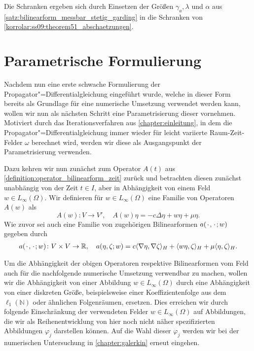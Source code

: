\documentclass[../main.tex]{subfiles}
\begin{document}
\begin{Korollar}
    \begin{Beweis}
        Die Schranken ergeben sich durch Einsetzen der Größen $\gamma_{a}, \lambda$ und $\alpha$ aus \cref{satz:bilinearform_messbar_stetig_garding} in die Schranken von \cref{korrolar:ss09:theorem51_abschaetzungen}.
    \end{Beweis}
\end{Korollar}


\section{Parametrische Formulierung} %
\label{section:parametrische_formulierung}

Nachdem nun eine erste schwache Formulierung der Propagator"=Differentialgleichung eingeführt wurde, welche in dieser Form bereits als Grundlage für eine numerische Umsetzung verwendet werden kann, wollen wir nun als nächsten Schritt eine Parametrisierung dieser vornehmen.
Motiviert durch das Iterationsverfahren aus \cref{chapter:einleitung}, in dem die Propagator"=Differentialgleichung immer wieder für leicht variierte Raum-Zeit-Felder $\omega$ berechnet wird, werden wir diese als Ausgangspunkt der Parametrisierung verwenden.

Dazu kehren wir nun zunächst zum Operator $A(t)$ aus \cref{definition:operator_bilinearform_zeit} zurück und betrachten diesen zunächst unabhängig von der Zeit $t \in I$, aber in Abhängigkeit von einem Feld $w \in L_{\infty}(\Omega)$.
Wir definieren für $w \in L_{\infty}(\Omega)$ eine Familie von Operatoren $A(w)$ als
\begin{equation}
    \label{eq:operator_feld}
    A(w) \colon V \to V', \quad A(w) \eta = - c \Delta \eta + w \eta + \mu \eta.
\end{equation}
Wie zuvor sei auch eine Familie von zugehörigen Bilinearformen $a({\mkern2mu\cdot\mkern2mu}, {\mkern2mu\cdot\mkern2mu}; w)$ gegeben durch
\begin{equation}
    \label{eq:bilinearform_feld}
    \begin{aligned}
        a({\mkern2mu\cdot\mkern2mu}, {\mkern2mu\cdot\mkern2mu}; w) \colon V \times V \to \mathbb{R}, \quad
        a(\eta, \zeta; w) = c\langle\nabla \eta,\nabla \zeta\rangle_{H} + \langle w \eta,\zeta\rangle_{H} + \mu \langle\eta,\zeta\rangle_{H}.
    \end{aligned}
\end{equation}

Um die Abhängigkeit der obigen Operatoren respektive Bilinearformen vom Feld auch für die nachfolgende numerische Umsetzung verwendbar zu machen, wollen wir die Abhängigkeit von einer Abbildung $w \in L_{\infty}(\Omega)$ durch eine Abhängigkeit von einer diskreten Größe, beispielsweise einer Koeffizientenfolge aus dem $\ell_{1}(\mathbb{N})$ oder ähnlichen Folgenräumen, ersetzen.
Dies erreichen wir durch folgende Einschränkung der verwendeten Felder $w \in L_{\infty}(\Omega)$ auf Abbildungen, die wir als Reihenentwicklung von hier noch nicht näher spezifizierten Abbildungen $\varphi_{j}$ darstellen können.
Auf die Wahl dieser $\varphi_{j}$ werden wir bei der numerischen Untersuchung in \cref{chapter:galerkin} erneut eingehen.
\end{document}
